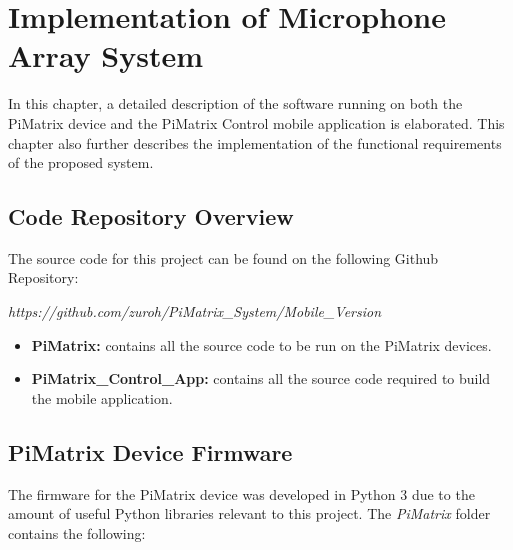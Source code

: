 \documentclass[hidelinks,12pt]{report} %
\begin{document}
\chapter{Implementation of Microphone Array System}

In this chapter, a detailed description of the software running on both the PiMatrix device and the PiMatrix Control mobile application is elaborated. 
This chapter also further describes the implementation of the functional requirements of the proposed system.


\section{Code Repository Overview}

The source code for this project can be found on the following Github Repository:\linebreak

\textit{https://github.com/zuroh/PiMatrix\_System/Mobile\_Version}



	\begin{itemize}
		\item{\textbf{PiMatrix: }}
		contains all the source code to be run on the PiMatrix devices.
		\item{\textbf{PiMatrix\_Control\_App: }}
		contains all the source code required to build the mobile application. 

	
		
	\end{itemize}

\section{PiMatrix Device Firmware}

The firmware for the PiMatrix device was developed in Python 3 due to the amount of useful Python libraries relevant to this project. The \textit{PiMatrix} folder contains the following:
\end{document}
